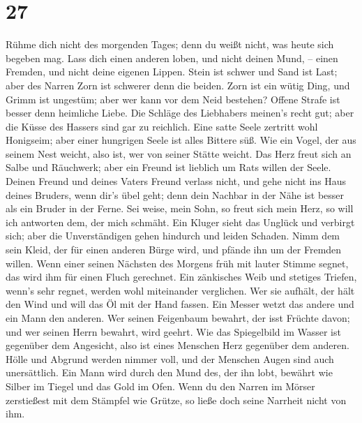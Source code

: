 \hypertarget{section-26}{%
\section{27}\label{section-26}}

 Rühme dich nicht des morgenden Tages; denn du weißt
nicht, was heute sich begeben mag.  Lass dich einen
anderen loben, und nicht deinen Mund, -- einen Fremden, und nicht deine
eigenen Lippen.  Stein ist schwer und Sand ist Last; aber
des Narren Zorn ist schwerer denn die beiden.  Zorn ist
ein wütig Ding, und Grimm ist ungestüm; aber wer kann vor dem Neid
bestehen?  Offene Strafe ist besser denn heimliche Liebe.
 Die Schläge des Liebhabers meinen's recht gut; aber die
Küsse des Hassers sind gar zu reichlich.  Eine satte Seele
zertritt wohl Honigseim; aber einer hungrigen Seele ist alles Bittere
süß.  Wie ein Vogel, der aus seinem Nest weicht, also ist,
wer von seiner Stätte weicht.  Das Herz freut sich an
Salbe und Räuchwerk; aber ein Freund ist lieblich um Rats willen der
Seele.  Deinen Freund und deines Vaters Freund verlass
nicht, und gehe nicht ins Haus deines Bruders, wenn dir's übel geht;
denn dein Nachbar in der Nähe ist besser als ein Bruder in der Ferne.
 Sei weise, mein Sohn, so freut sich mein Herz, so will
ich antworten dem, der mich schmäht.  Ein Kluger sieht
das Unglück und verbirgt sich; aber die Unverständigen gehen hindurch
und leiden Schaden.  Nimm dem sein Kleid, der für einen
anderen Bürge wird, und pfände ihn um der Fremden willen.
 Wenn einer seinen Nächsten des Morgens früh mit lauter
Stimme segnet, das wird ihm für einen Fluch gerechnet. 
Ein zänkisches Weib und stetiges Triefen, wenn's sehr regnet, werden
wohl miteinander verglichen.  Wer sie aufhält, der hält
den Wind und will das Öl mit der Hand fassen.  Ein Messer
wetzt das andere und ein Mann den anderen.  Wer seinen
Feigenbaum bewahrt, der isst Früchte davon; und wer seinen Herrn
bewahrt, wird geehrt.  Wie das Spiegelbild im Wasser ist
gegenüber dem Angesicht, also ist eines Menschen Herz gegenüber dem
anderen.  Hölle und Abgrund werden nimmer voll, und der
Menschen Augen sind auch unersättlich.  Ein Mann wird
durch den Mund des, der ihn lobt, bewährt wie Silber im Tiegel und das
Gold im Ofen.  Wenn du den Narren im Mörser zerstießest
mit dem Stämpfel wie Grütze, so ließe doch seine Narrheit nicht von ihm.

